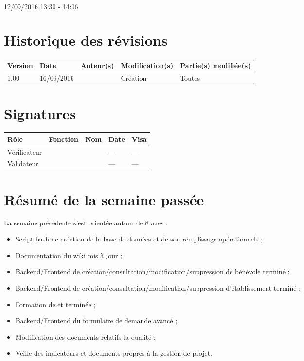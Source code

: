 \documentclass [a4paper] {article}
\begin{document}
12/09/2016			 				%
\hfill   
\hfill 	 13:30 - 14:06				%


\section*{Historique des révisions}
\begin{center}
			\begin{tabular}{| p{2.5cm} | p{3cm} | p{3cm} | p{3cm} | p{3.5cm} |}
				\hline
				\rowcolor{Gray}
				Version & Date & Auteur(s) & Modification(s) & Partie(s) modifiée(s)		 \\
				\hline
				1.00 & 16/09/2016 & \Kafui & Création & Toutes \\
				\hline			
			\end{tabular}
		\end{center}

\section*{Signatures}

		\begin{center}
			\begin{tabular}{| p{2.5cm} | p{4cm} | p{3cm} | p{3cm} | p{2.5cm} |}
				\hline
				\rowcolor{Gray}
				Rôle & Fonction & Nom & Date & Visa		 \\
				\hline
				Vérificateur & \RGC & \Melissa &  --- & --- \\[30pt]
				\hline
				Validateur & \CP & \Pierre &  --- & --- \\[30pt]	
				\hline
			\end{tabular}
		\end{center}

\section{Résumé de la semaine passée}
La semaine précédente s'est orientée autour de 8 axes :  
\begin{itemize}
\item Script bash de création de la base de données et de son remplissage opérationnels ;
\item Documentation du wiki mis à jour ;
\item Backend/Frontend de création/consultation/modification/suppression de bénévole terminé ;
\item Backend/Frontend de création/consultation/modification/suppression d'établissement terminé ;
\item Formation de \Juliana{} et \Francois terminée ;
\item Backend/Frontend du formulaire de demande avancé ;
\item Modification des documents relatifs la qualité ;
\item Veille des indicateurs et documents propres à la gestion de projet.
\end{itemize} 
\end{document}
